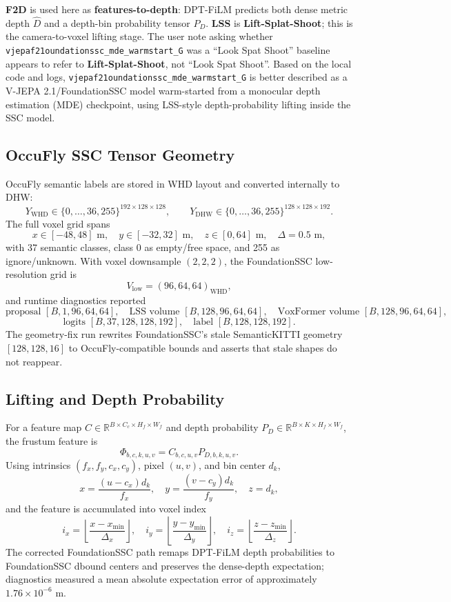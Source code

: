 \documentclass[10pt]{article}
\newcommand{\R}{\mathbb{R}}
\newcommand{\Vox}{V}
\newcommand{\codepath}[1]{\begingroup\small\nolinkurl{#1}\endgroup}
\begin{document}
\textbf{F2D} is used here as \textbf{features-to-depth}: DPT-FiLM predicts both dense metric depth \(\hat{D}\) and a depth-bin probability tensor \(P_D\).  \textbf{LSS} is \textbf{Lift-Splat-Shoot}; this is the camera-to-voxel lifting stage.  The user note asking whether \codepath{vjepaf21oundationssc_mde_warmstart_G} was a ``Look Spat Shoot'' baseline appears to refer to \textbf{Lift-Splat-Shoot}, not ``Look Spat Shoot''.  Based on the local code and logs, \codepath{vjepaf21oundationssc_mde_warmstart_G} is better described as a V-JEPA 2.1/FoundationSSC model warm-started from a monocular depth estimation (MDE) checkpoint, using LSS-style depth-probability lifting inside the SSC model.

\subsection{OccuFly SSC Tensor Geometry}
OccuFly semantic labels are stored in WHD layout and converted internally to DHW:
\[
Y_{\mathrm{WHD}}\in\{0,\ldots,36,255\}^{192\times128\times128},
\qquad
Y_{\mathrm{DHW}}\in\{0,\ldots,36,255\}^{128\times128\times192}.
\]
The full voxel grid spans
\[
x\in[-48,48]\text{ m},\quad y\in[-32,32]\text{ m},\quad z\in[0,64]\text{ m},\quad
\Delta=0.5\text{ m},
\]
with 37 semantic classes, class 0 as empty/free space, and 255 as ignore/unknown.  With voxel downsample \((2,2,2)\), the FoundationSSC low-resolution grid is
\[
\Vox_{\mathrm{low}}=(96,64,64)_{\mathrm{WHD}},
\]
and runtime diagnostics reported
\[
\text{proposal }[B,1,96,64,64],\quad
\text{LSS volume }[B,128,96,64,64],\quad
\text{VoxFormer volume }[B,128,96,64,64],
\]
\[
\text{logits }[B,37,128,128,192],\quad
\text{label }[B,128,128,192].
\]
The geometry-fix run rewrites FoundationSSC's stale SemanticKITTI geometry \([128,128,16]\) to OccuFly-compatible bounds and asserts that stale shapes do not reappear.

\subsection{Lifting and Depth Probability}
For a feature map \(C\in\R^{B\times C_c\times H_f\times W_f}\) and depth probability \(P_D\in\R^{B\times K\times H_f\times W_f}\), the frustum feature is
\[
\Phi_{b,c,k,u,v}=C_{b,c,u,v}P_{D,b,k,u,v}.
\]
Using intrinsics \((f_x,f_y,c_x,c_y)\), pixel \((u,v)\), and bin center \(d_k\),
\[
x=\frac{(u-c_x)d_k}{f_x},\quad y=\frac{(v-c_y)d_k}{f_y},\quad z=d_k,
\]
and the feature is accumulated into voxel index
\[
i_x=\left\lfloor\frac{x-x_{\min}}{\Delta_x}\right\rfloor,\quad
i_y=\left\lfloor\frac{y-y_{\min}}{\Delta_y}\right\rfloor,\quad
i_z=\left\lfloor\frac{z-z_{\min}}{\Delta_z}\right\rfloor .
\]
The corrected FoundationSSC path remaps DPT-FiLM depth probabilities to FoundationSSC dbound centers and preserves the dense-depth expectation; diagnostics measured a mean absolute expectation error of approximately \(1.76\times10^{-6}\) m.
\end{document}
